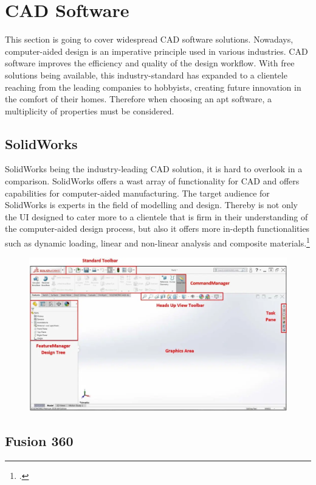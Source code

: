 \section{CAD Software}

This section is going to cover widespread CAD software solutions. Nowadays, computer-aided design is an imperative principle used in various industries. CAD software improves the efficiency and quality of the design workflow. With free solutions being available, this industry-standard has expanded to a clientele reaching from the leading companies to hobbyists, creating future innovation in the comfort of their homes. Therefore when choosing an apt software, a multiplicity of properties must be considered.

\subsection{SolidWorks}

SolidWorks being the industry-leading CAD solution, it is hard to overlook in a comparison. SolidWorks offers a wast array of functionality for CAD and offers capabilities for computer-aided manufacturing. 
The target audience for SolidWorks is experts in the field of modelling and design. Thereby is not only the UI designed to cater more to a clientele that is firm in their understanding of the computer-aided design process, but also it offers more in-depth functionalities such as dynamic loading, linear and non-linear analysis and composite materials.\footcite{all3dpSolidWorksVsFusion2021}

\begin{figure}[h]
	\centering
	\includegraphics[width=0.6\linewidth]{img/SolidWorksUI}
	\caption{}
	\label{fig:custom_parts_solidworks}
\end{figure}


\subsection{Fusion 360}


